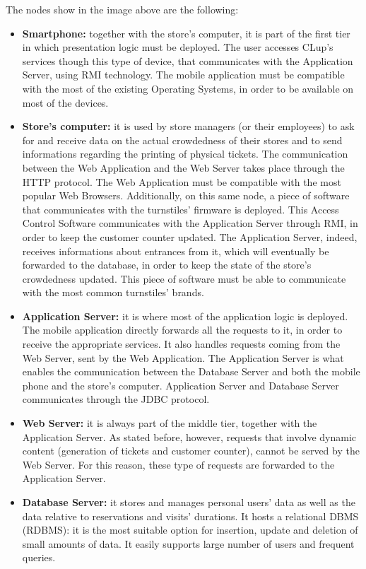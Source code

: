 \documentclass{article}
\begin{document}
The nodes show in the image above are the following:
\begin{itemize}
\item\textbf{Smartphone:} together with the store’s computer, it is part of the first tier in which presentation logic must be deployed. The user accesses CLup’s services though this type of device, that communicates with the Application Server, using RMI technology. The mobile application must be compatible with the most of the existing Operating Systems, in order to be available on most of the devices.
\item\textbf{Store’s computer:} it is used by store managers (or their employees) to ask for and receive data on the actual crowdedness of their stores and to send informations regarding the printing of physical tickets. The communication between the Web Application and the Web Server takes place through the HTTP protocol. The Web Application must be compatible with the most popular Web Browsers.
Additionally, on this same node, a piece of software that communicates with the turnstiles' firmware is deployed. This Access Control Software communicates with the Application Server through RMI, in order to keep the customer counter updated. The Application Server, indeed, receives informations about entrances from it, which will eventually be forwarded to the database, in order to keep the state of the store’s crowdedness updated. This piece of software must be able to communicate with the most common turnstiles’ brands.
\item\textbf{Application Server:} it is where most of the application logic is deployed. The mobile application directly forwards all the requests to it, in order to receive the appropriate services. It also handles requests coming from the Web Server, sent by the Web Application. The Application Server is what enables the communication between the Database Server and both the mobile phone and the store's computer. Application Server and Database Server communicates through the JDBC protocol.
\item\textbf{Web Server:} it is always part of the middle tier, together with the Application Server. As stated before, however, requests that involve dynamic content (generation of tickets and customer counter), cannot be served by the Web Server. For this reason, these type of requests are forwarded to the Application Server.
\item\textbf{Database Server:} it stores and manages personal users’ data as well as the data relative to reservations and visits’ durations. It hosts a relational DBMS (RDBMS): it is the most suitable option for insertion, update and deletion of small amounts of data. It easily supports large number of users and frequent queries.
\end{itemize}
\end{document}
